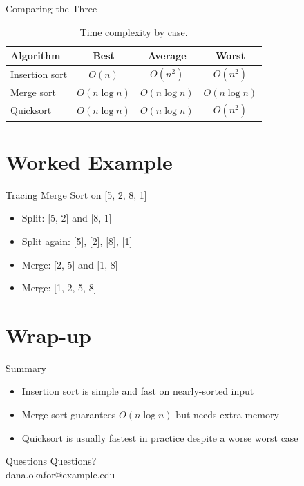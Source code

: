 \documentclass{beamer}
\begin{document}
\begin{frame}{Comparing the Three}
  \begin{table}
    \centering
    \begin{tabular}{lccc}
      \toprule
      Algorithm & Best & Average & Worst \\
      \midrule
      Insertion sort & $O(n)$ & $O(n^2)$ & $O(n^2)$ \\
      Merge sort & $O(n\log n)$ & $O(n\log n)$ & $O(n\log n)$ \\
      Quicksort & $O(n\log n)$ & $O(n\log n)$ & $O(n^2)$ \\
      \bottomrule
    \end{tabular}
    \caption{Time complexity by case.}
  \end{table}
\end{frame}

\section{Worked Example}

\begin{frame}{Tracing Merge Sort on [5, 2, 8, 1]}
  \begin{itemize}
    \item Split: [5, 2] and [8, 1]
    \item Split again: [5], [2], [8], [1]
    \item Merge: [2, 5] and [1, 8]
    \item Merge: [1, 2, 5, 8]
  \end{itemize}
\end{frame}

\section{Wrap-up}

\begin{frame}{Summary}
  \begin{itemize}
    \item Insertion sort is simple and fast on nearly-sorted input
    \item Merge sort guarantees $O(n \log n)$ but needs extra memory
    \item Quicksort is usually fastest in practice despite a worse worst case
  \end{itemize}
\end{frame}

\begin{frame}{Questions}
  \centering
  \Large Questions?\\[1em]
  \normalsize dana.okafor@example.edu
\end{frame}
\end{document}
